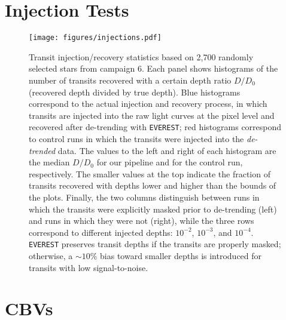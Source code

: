 \documentclass[]{emulateapj}
\begin{document}
\section{Injection Tests}
\label{sec:inj}

\begin{figure}[ht]
  \begin{center}
      \texttt{[image: figures/injections.pdf]}
       \caption{Transit injection/recovery statistics based on 2,700 randomly selected stars from campaign 6.
       Each panel shows histograms of the number of transits recovered with a certain depth 
       ratio $D/D_0$ (recovered depth divided by true depth). Blue histograms correspond to the actual
       injection and recovery process, in which transits are injected into the raw light curves at the pixel level
       and recovered after de-trending with \texttt{EVEREST}; red histograms correspond to control runs in which the transits
       were injected into the \emph{de-trended} data. The values 
       to the left and right of each histogram are the median $D/D_0$ for our pipeline and for the 
       control run, respectively. The smaller values at the top indicate the fraction of transits recovered 
       with depths lower and higher than the bounds of the plots. Finally, the two columns distinguish between 
       runs in which the transits were explicitly masked prior to de-trending (left) and runs in which they were not (right), 
       while the three rows correspond to different injected depths: $10^{−2}$, $10^{−3}$, and $10^{−4}$. \texttt{EVEREST} 
       preserves transit depths if the transits are properly masked; otherwise, a ${\sim}10\%$ bias toward smaller depths is 
       introduced for transits with low signal-to-noise.}
     \label{fig:injections}
  \end{center}
\end{figure}

\section{CBVs}
\label{sec:cbvs}
\end{document}
